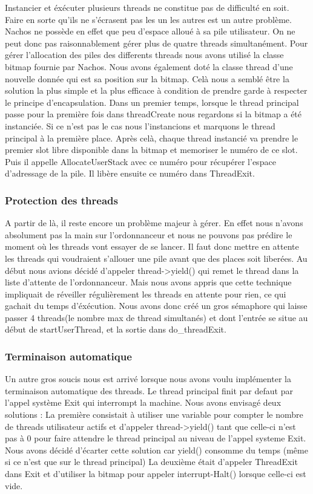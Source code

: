 \documentclass[12pt]{article}
\begin{document}
Instancier et éxécuter plusieurs threads ne constitue pas de difficulté en soit.
Faire en sorte qu'ils ne s'écrasent pas les un les autres est un autre problème.
Nachos ne possède en effet que peu d'espace alloué à sa pile utilisateur.
On ne peut donc pas raisonnablement gérer plus de quatre threads simultanément.
Pour gérer l'allocation des piles des differents threads nous avons utilisé la classe
bitmap fournie par Nachos. Nous avons également doté la classe thread d'une nouvelle donnée
qui est sa position sur la bitmap. Celà nous a semblé être la solution la plus simple et
la plus efficace à condition de prendre garde à respecter le principe d'encapsulation.
Dans un premier temps, lorsque le thread principal passe pour la première fois dans threadCreate
nous regardons si la bitmap a été instanciée. Si ce n'est pas le cas nous l'instancions
et marquons le thread principal à la première place.
Après celà, chaque thread instancié va prendre le premier slot libre disponible dans
la bitmap et memoriser le numéro de ce slot. Puis il appelle AllocateUserStack avec ce
numéro pour récupérer l'espace d'adressage de la pile.
Il libère ensuite ce numéro dans ThreadExit.

\subsubsection{Protection des threads}

A partir de là, il reste encore un problème majeur à gérer. En effet nous n'avons absolument
pas la main sur l'ordonnanceur et nous ne pouvons pas prédire le moment où les threads
vont essayer de se lancer. Il faut donc mettre en attente les threads qui voudraient
s'allouer une pile avant que des places soit liberées. Au début nous avions décidé
d'appeler thread->yield() qui remet le thread dans la liste d'attente de l'ordonnanceur.
Mais nous avons appris que cette technique impliquait de réveiller régulièrement les
threads en attente pour rien, ce qui gachait du temps d'éxécution.
Nous avons donc créé un gros sémaphore qui laisse passer 4 threads(le nombre max de thread
simultanés) et dont l'entrée se situe au début de startUserThread, et la sortie dans do_threadExit.

\subsubsection{Terminaison automatique}
Un autre gros soucis nous est arrivé lorsque nous avons voulu implémenter la terminaison
automatique des threads. Le thread principal finit par defaut par l'appel système Exit
qui interrompt la machine.
Nous avons envisagé deux solutions :
La première consistait à utiliser une variable pour compter le nombre de threads utilisateur actifs
et d'appeler thread->yield() tant que celle-ci n'est pas à 0 pour faire attendre le thread principal
au niveau de l'appel systeme Exit. Nous avons décidé d'écarter cette solution car yield()
consomme du temps (même si ce n'est que sur le thread principal)
La deuxième était d'appeler ThreadExit dans Exit et d'utiliser la bitmap pour appeler interrupt-Halt()
lorsque celle-ci est vide.
\end{document}
